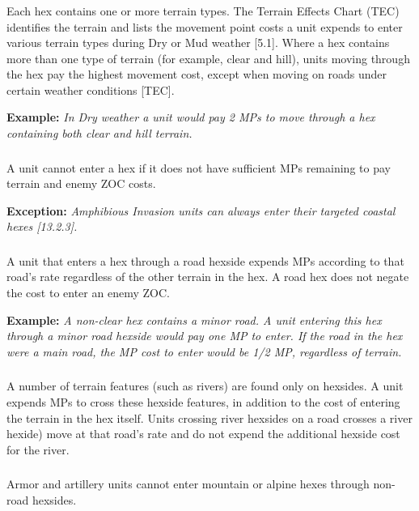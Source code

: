 \subsubsection{}
Each hex contains one or more terrain types. The Terrain Effects Chart (TEC) identifies the terrain and lists the movement point costs a unit expends to enter various terrain types during Dry or Mud weather [5.1]. Where a hex contains more than one type of terrain (for example, clear and hill), units moving through the hex pay the highest movement cost, except when moving on roads under certain weather conditions [TEC].

\textbf{Example:} \textit{In Dry weather a unit would pay 2 MPs to move through a hex containing both clear and hill terrain.}

\subsubsection{}
A unit cannot enter a hex if it does not have sufficient MPs remaining to pay terrain and enemy ZOC costs.

\textbf{Exception:} \textit{Amphibious Invasion units can always enter their targeted coastal hexes [13.2.3].}

\subsubsection{}
A unit that enters a hex through a road hexside expends MPs according to that road's rate regardless of the other terrain in the hex. A road hex does not negate the cost to enter an enemy ZOC.

\textbf{Example:} \textit{A non-clear hex contains a minor road. A unit entering this hex through a minor road hexside would pay one MP to enter. If the road in the hex were a main road, the MP cost to enter would be 1/2 MP, regardless of terrain.}

\subsubsection{}
A number of terrain features (such as rivers) are found only on hexsides. A unit expends MPs to cross these hexside features, in addition to the cost of entering the terrain in the hex itself. Units crossing river hexsides on a road crosses a river hexide) move at that road's rate and do not expend the additional hexside cost for the river.

\subsubsection{}
Armor and artillery units cannot enter mountain or alpine hexes through non-road hexsides.

